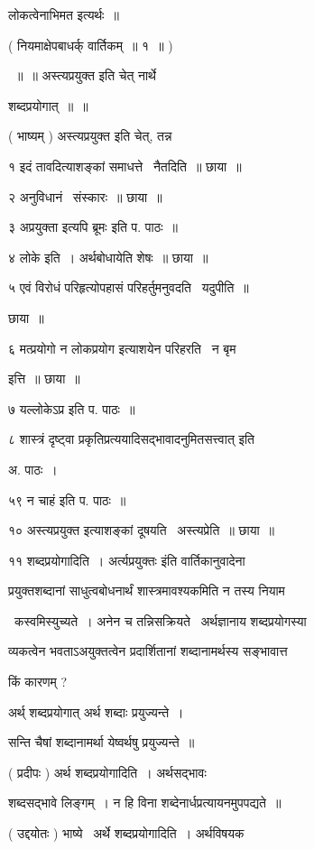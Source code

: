 \documentclass[11pt, openany]{book}
\begin{document}
लोकत्वेनाभिमत इत्यर्थः~॥ 

( नियमाक्षेपबाधर्क् वार्तिकम्~॥ १~॥ ) 

~॥~॥ अस्त्यप्रयुक्त इति चेत् नार्थे 

शब्दप्रयोगात्~॥~॥ 

( भाष्यम् ) अस्त्यप्रयुक्त इति चेत्, तन्न



१ इदं तावदित्याशङ्कां समाधत्ते \textendash\ नैतदिति~॥ छाया~॥ 

२ अनुविधानं \textendash\ संस्कारः~॥ छाया~॥ 

३ {\qt अप्रयुक्ता इत्यपि ब्रूमः} इति प. पाठः~॥ 

४ लोके इति~। अर्थबोधायेति शेषः~॥ छाया~॥ 

५ एवं विरोधं परिहृत्योपहासं परिहर्तुमनुवदति \textendash\ यदुपीति~॥ 

छाया~॥ 

६ मत्प्रयोगो न लोकप्रयोग इत्याशयेन परिहरति \textendash\ न बृम 

इत्ति~॥ छाया~॥ 

७ {\qt यल्लोकेऽप्र} इति प. पाठः~॥ 

८ {\qt शास्त्रं दृष्ट्वा प्रकृतिप्रत्ययादिसद्भावादनुमितसत्त्वात्} इति 

अ. पाठः~। 

५९ {\qt न चाहं} इति प. पाठः~॥ 

१० {\qt अस्त्यप्रयुक्त} इत्याशङ्कां दूषयति \textendash\ अस्त्यप्रेति~॥ छाया~॥ 

११ शब्दप्रयोगादिति~। {\qt अर्त्यप्रयुक्तः} इंति वार्तिकानुवादेना \textendash\ 

प्रयुक्तशब्दानां साधुत्वबोधनार्थं शास्त्रमावश्यकमिति न तस्य नियाम \textendash\ 

 \textendash\ कस्वमिस्युच्यते~। अनेन च तन्निसक्रियते \textendash\ अर्थज्ञानाय शब्दप्रयोगस्या \textendash\ 

व्यकत्वेन भवताऽअयुक्तत्वेन प्रदार्शितानां शब्दानामर्थस्य सङ्भावात्त \textendash\ 





किं कारणम् ? 

{\qt अर्थ् शब्दप्रयोगात्} अर्थ शब्दाः प्रयुज्यन्ते~। 

सन्ति चैषां शब्दानामर्था येष्वर्थषु प्रयुज्यन्ते~॥ 

( प्रदीपः ) अर्थ शब्दप्रयोगादिति~। अर्थसद्भावः 

शब्दसद्भावे लिङ्गम्~। न हि विना शब्देनार्धप्रत्यायनमुपपद्यते~॥ 

( उद्दयोतः ) भाष्ये \textendash\ अर्थे शब्दप्रयोगादिति~। अर्थविषयक \textendash\ 
\end{document}

